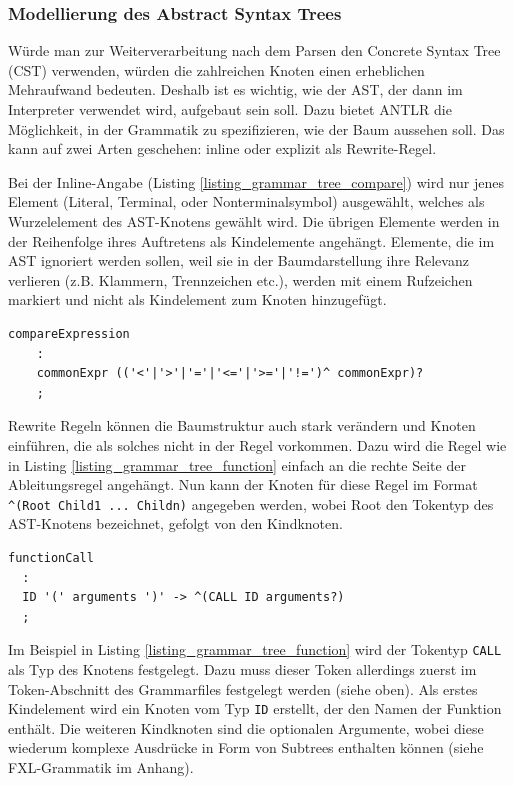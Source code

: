 \subsubsection{Modellierung des Abstract Syntax Trees}

Würde man zur Weiterverarbeitung nach dem Parsen den Concrete Syntax Tree (CST) verwenden, würden die zahlreichen Knoten einen erheblichen Mehraufwand bedeuten. Deshalb ist es wichtig, wie der AST, der dann im Interpreter verwendet wird, aufgebaut sein soll. Dazu bietet ANTLR die Möglichkeit, in der Grammatik zu spezifizieren, wie der Baum aussehen soll. Das kann auf zwei Arten geschehen: inline oder explizit als Rewrite-Regel.

Bei der Inline-Angabe (Listing \ref{listing_grammar_tree_compare}) wird nur jenes Element (Literal, Terminal, oder Nonterminalsymbol) ausgewählt, welches als Wurzelelement des AST-Knotens gewählt wird. Die übrigen Elemente werden in der Reihenfolge ihres Auftretens als Kindelemente an\-ge\-hängt. Elemente, die im AST ignoriert werden sollen, weil sie in der Baumdarstellung ihre Relevanz verlieren (z.B. Klammern, Trennzeichen etc.), werden mit einem Rufzeichen markiert und nicht als Kindelement zum Knoten hinzugefügt.


\begin{lstlisting}[float = htbp,caption={Inline-Regeln zur Beschreibung der Baumstruktur.},label=listing_grammar_tree_compare]
compareExpression
  	:
  	commonExpr (('<'|'>'|'='|'<='|'>='|'!=')^ commonExpr)?
  	;

\end{lstlisting}

Rewrite Regeln können die Baumstruktur auch stark verändern und Knoten einführen, die als solches nicht in der Regel vorkommen. Dazu wird die Regel wie in Listing \ref{listing_grammar_tree_function} einfach an die rechte Seite der Ab\-lei\-tungs\-re\-gel an\-ge\-hängt. Nun kann der Knoten für diese Regel im Format \texttt{\textasciicircum(Root Child1 ... Childn)} angegeben werden, wobei Root den Tokentyp des AST-Knotens bezeichnet, gefolgt von den Kindknoten. 


\begin{lstlisting}[float = htbp,caption={Rewrite-Regeln zur Beschreibung der Baumstruktur.},label=listing_grammar_tree_function]
functionCall
  :
  ID '(' arguments ')' -> ^(CALL ID arguments?)
  ;
\end{lstlisting}

Im Beispiel in Listing \ref{listing_grammar_tree_function} wird der Tokentyp \texttt{CALL} als Typ des Knotens festgelegt. Dazu muss dieser Token allerdings zuerst im Token-Abschnitt des Grammarfiles festgelegt werden (siehe oben). Als erstes Kindelement wird ein Knoten vom Typ \texttt{ID} erstellt, der den Namen der Funktion enthält. Die weiteren Kindknoten sind die optionalen Argumente, wobei diese wiederum komplexe Ausdrücke in Form von Subtrees enthalten können (siehe FXL-Grammatik im Anhang).

